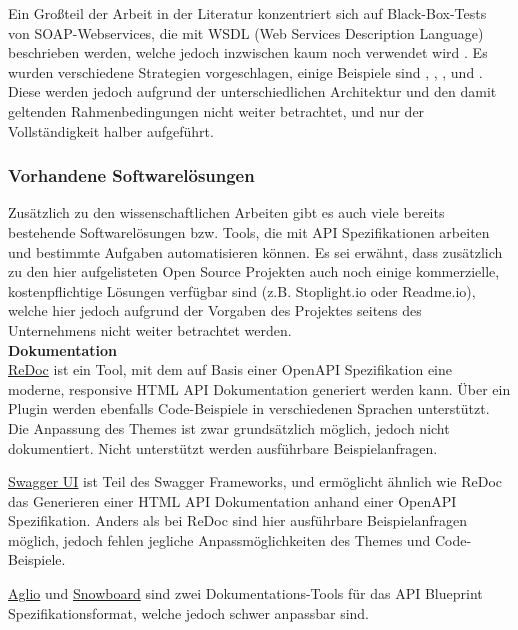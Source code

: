 Ein Großteil der Arbeit in der Literatur konzentriert sich auf Black-Box-Tests von SOAP-Webservices, die mit WSDL (Web Services Description Language) beschrieben werden, welche jedoch inzwischen kaum noch verwendet wird \parencite[37--39]{scherer2016description}. Es wurden verschiedene Strategien vorgeschlagen, einige Beispiele sind \textcite{xu2005testing}, \textcite{bai2005wsdl}, \textcite{martin2006automated}, \textcite{ma2008wsdl} und \textcite{bartolini2009ws}. Diese werden jedoch aufgrund der unterschiedlichen Architektur und den damit geltenden Rahmenbedingungen nicht weiter betrachtet, und nur der Vollständigkeit halber aufgeführt.


\subsubsection{Vorhandene Softwarelösungen}

Zusätzlich zu den wissenschaftlichen Arbeiten gibt es auch viele bereits bestehende Softwarelösungen bzw. Tools, die mit API Spezifikationen arbeiten und bestimmte Aufgaben automatisieren können. Es sei erwähnt, dass zusätzlich zu den hier aufgelisteten Open Source Projekten auch noch einige kommerzielle, kostenpflichtige Lösungen verfügbar sind (z.B. Stoplight.io oder Readme.io), welche hier jedoch aufgrund der Vorgaben des Projektes seitens des Unternehmens nicht weiter betrachtet werden.\\

\textbf{Dokumentation}\\
\href{https://github.com/Rebilly/ReDoc}{ReDoc} ist ein Tool, mit dem auf Basis einer OpenAPI Spezifikation eine moderne, responsive HTML API Dokumentation generiert werden kann. Über ein Plugin werden ebenfalls Code-Beispiele in verschiedenen Sprachen unterstützt. Die Anpassung des Themes ist zwar grundsätzlich möglich, jedoch nicht dokumentiert. Nicht unterstützt werden ausführbare Beispielanfragen.

\href{https://swagger.io/tools/swagger-ui/}{Swagger UI} ist Teil des Swagger Frameworks, und ermöglicht ähnlich wie ReDoc das Generieren einer HTML API Dokumentation anhand einer OpenAPI Spezifikation. Anders als bei ReDoc sind hier ausführbare Beispielanfragen möglich, jedoch fehlen jegliche Anpassmöglichkeiten des Themes und Code-Beispiele.

\href{https://github.com/danielgtaylor/aglio}{Aglio} und \href{https://github.com/subosito/snowboard}{Snowboard} sind zwei Dokumentations-Tools für das API Blueprint Spezifikationsformat, welche jedoch schwer anpassbar sind.

